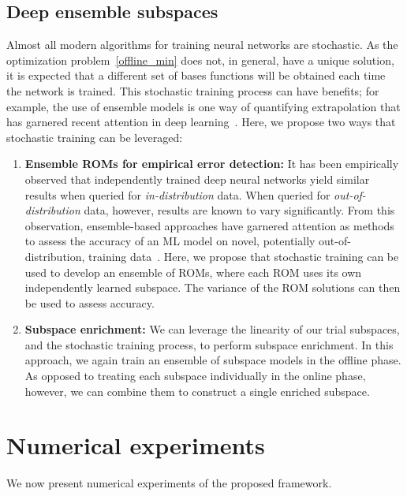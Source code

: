 \documentclass[3p,computermodern,10pt]{elsarticle}
\begin{document}
\subsection{Deep ensemble subspaces}
Almost all modern algorithms for training neural networks are stochastic. As the optimization problem~\eqref{offline_min} does not, in general, have a unique solution, it is expected that a different set of bases functions will be obtained each time the network is trained. This stochastic training process can have benefits; for example, the use of ensemble models is one way of quantifying extrapolation that has garnered recent attention in deep learning~\cite{deep_ensembles}. Here, we propose two ways that stochastic training can be leveraged:
\begin{enumerate}
\item \textbf{Ensemble ROMs for empirical error detection:} It has been empirically observed that independently trained deep neural networks yield similar results when queried for \textit{in-distribution} data. When queried for \textit{out-of-distribution} data, however, results are known to vary significantly. From this observation, ensemble-based approaches have garnered attention as methods to assess the accuracy of an ML model on novel, potentially out-of-distribution, training data~\cite{deep_ensembles}. Here, we propose that stochastic training can be used to develop an ensemble of ROMs, where each ROM uses its own independently learned subspace. The variance of the ROM solutions can then be used to assess accuracy.   

\item \textbf{Subspace enrichment:} We can leverage the linearity of our trial subspaces, and the stochastic training process, to perform subspace enrichment. In this approach, we again train an ensemble of subspace models in the offline phase. As opposed to treating each subspace individually in the online phase, however, we can combine them to construct a single enriched subspace.
\end{enumerate}  

\section{Numerical experiments}
We now present numerical experiments of the proposed framework.
\end{document}
